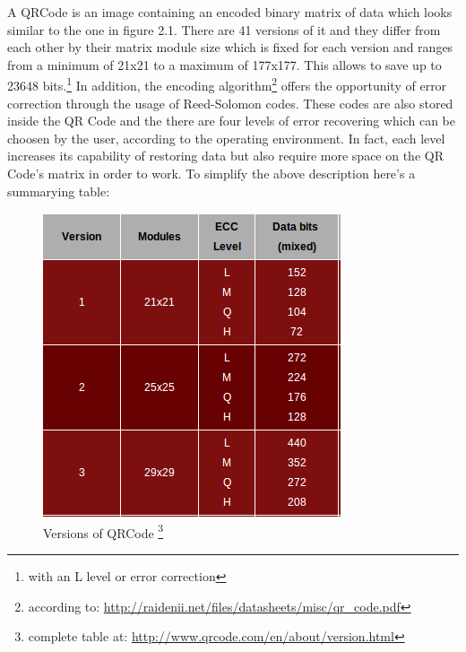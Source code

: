 A QRCode is an image containing an encoded binary matrix of data which looks similar to the one in figure 2.1.
There are 41 versions of it and they differ from each other by their matrix 
module size which is fixed for each version and ranges from a minimum of 21x21 
to a maximum of 177x177. This allows to save up to 23648 bits.\footnote{with an L level or error correction} 
\newline 
In addition, the encoding algorithm\footnote{ according to: \url{http://raidenii.net/files/datasheets/misc/qr_code.pdf}} offers the opportunity of error correction through the usage of Reed-Solomon codes.
These codes are also stored inside the QR Code and the there are four levels of error recovering which can be choosen by the user, according to the operating environment.
In fact, each level increases its capability of restoring data but also require more space on the QR Code's matrix in order to work. 
\newpage
To simplify the above description here's a summarying table:
\begin{figure}[hbt]
    \centering
    \caption{Versions of QRCode \protect \footnote{complete table at: \protect \url{http://www.qrcode.com/en/about/version.html}}}
    \includegraphics[scale=0.9]{img/qrversion.png}
\end{figure}


   













  
